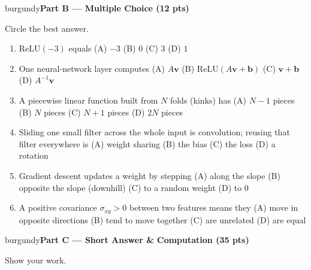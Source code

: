 \documentclass[10pt]{article}
\newcommand{\vv}{\mathbf{v}}
\newcommand{\bb}{\mathbf{b}}
\newcommand{\relu}{\mathrm{ReLU}}
\newcommand{\parthead}[1]{%
  \vspace{6pt}\noindent
  \begin{headlinebox}{burgundy}{\color{white}\bfseries #1}\end{headlinebox}%
  \vspace{4pt}}
\begin{document}
\parthead{Part B --- Multiple Choice (12 pts)}
Circle the best answer.

\begin{enumerate}[leftmargin=1.9em, itemsep=9pt]
  \item $\relu(-3)$ equals
    \hfill (A) $-3$ \quad (B) $0$ \quad (C) $3$ \quad (D) $1$
  \item One neural-network layer computes
    \hfill (A) $A\vv$ \quad (B) $\relu(A\vv+\bb)$ \quad (C) $\vv+\bb$ \quad (D) $A^{-1}\vv$
  \item A piecewise linear function built from $N$ folds (kinks) has
    \hfill (A) $N-1$ pieces \quad (B) $N$ pieces \quad (C) $N+1$ pieces \quad (D) $2N$ pieces
  \item Sliding one small filter across the whole input is convolution; reusing that filter everywhere is
    \hfill (A) weight sharing \quad (B) the bias \quad (C) the loss \quad (D) a rotation
  \item Gradient descent updates a weight by stepping
    \hfill (A) along the slope \quad (B) opposite the slope (downhill) \quad (C) to a random weight \quad (D) to $0$
  \item A positive covariance $\sigma_{xy}>0$ between two features means they
    \hfill (A) move in opposite directions \quad (B) tend to move together \quad (C) are unrelated \quad (D) are equal
\end{enumerate}

\parthead{Part C --- Short Answer \& Computation (35 pts)}
Show your work.
\end{document}

